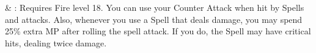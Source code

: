 \begin{tabjob}
     & %
    : Requires Fire level 18. You can use your Counter Attack when hit by Spells and  attacks. Also, whenever you use a Spell that deals damage, you may spend 25\% extra MP after rolling the spell attack. If you do, the Spell may have critical hits, dealing twice damage. \\
\end{tabjob}